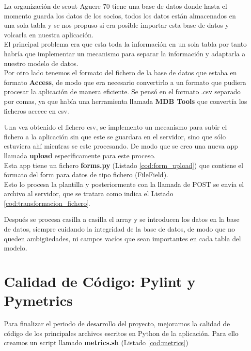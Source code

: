 La organización de scout Aguere 70 tiene una base de datos donde hasta el momento guarda los datos de los socios, todos los datos están almacenados en una sola tabla y se nos propuso si era posible importar esta base de datos
y volcarla en nuestra aplicación.\\

El principal problema era que esta toda la información en un sola tabla por tanto habría que implementar un mecanismo para separar la información y adaptarla a nuestro modelo de datos.\\

Por otro lado tenemos el formato del fichero de la base de datos que estaba en formato \textbf{Access}, de modo que era necesario convertirlo a un formato que pudiera procesar la aplicación de manera eficiente. Se pensó 
en el formato .csv separado por comas, ya que había una herramienta llamada \textbf{MDB Tools} que convertía los ficheros accecc en csv.

Una vez obtenido el fichero csv, se implemento un mecanismo para subir el fichero a la aplicación sin que este se guardara en el servidor, sino que sólo estuviera ahí mientras se este procesando. De modo que se creo 
una nueva app llamada \textbf{upload} específicamente para este proceso.\\

Esta app tiene un fichero \textbf{forms.py} (Listado \ref{cod:form_upload}) que contiene el formato del form para datos de tipo fichero (FileField).\\


\bigskip
Esto lo procesa la plantilla y posteriormente con la llamada de POST se envía el archivo al servidor, que se tratara como indica el Listado \ref{cod:transformacion_fichero}.
\bigskip


Después se procesa casilla a casilla el array y se introducen los datos en la base de datos, siempre cuidando la integridad de la base de datos, de modo que no queden ambigüedades, ni campos vacíos que sean importantes 
en cada tabla del modelo.\\

\section{Calidad de Código: Pylint y Pymetrics}
\label{4:sec12}
Para finalizar el periodo de desarrollo del proyecto, mejoramos la calidad de código de los principales archivos escritos en Python de la aplicación. 
Para ello creamos un script llamado \textbf{metrics.sh} (Listado \ref{cod:metrics})

